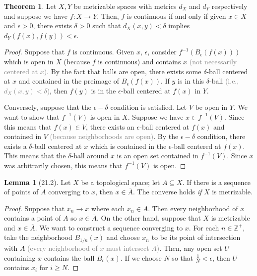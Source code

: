 \documentclass{article}
\newcommand{\nline}{\vspace*{0.5\baselineskip}}
\newcommand{\com}[1]{\textcolor{grey}{#1}}
\theoremstyle{definition}
\newtheorem{theorem}{Theorem}[subsection]
\newtheorem{lemma}{Lemma}[subsection]
\begin{document}
\begin{flushleft}
\begin{theorem}
Let $X, Y$ be metrizable spaces with metrics $d_X$ and $d_Y$ respectively and suppose we have $f : X \to Y$. Then, $f$ is continuous if and only if given $x \in X$ and $\epsilon > 0$, there exists $\delta > 0$ such that $d_X(x,y) < \delta$ implies $d_Y(f(x),f(y)) < \epsilon$.
\end{theorem}

\begin{proof}
Suppose that $f$ is continuous. Given $x$, $\epsilon$, consider $f^{-1}(B_\epsilon(f(x)))$ which is open in $X$ (because $f$ is continuous) and contains $x$ \com{(not necessarily centered at $x$)}. By the fact that balls are open, there exists some $\delta$-ball centered at $x$ and contained in the preimage of $B_\epsilon(f(x))$. If $y$ is in this $\delta$-ball \com{(i.e., $d_X(x,y) < \delta$)}, then $f(y)$ is in the $\epsilon$-ball centered at $f(x)$ in $Y$.

\nline

Conversely, suppose that the $\epsilon-\delta$ condition is satisfied. Let $V$ be open in $Y$. We want to show that $f^{-1}(V)$ is open in $X$. Suppose we have $x \in f^{-1}(V)$. Since this means that $f(x) \in V$, there exists an $\epsilon$-ball centered at $f(x)$ and contained in $V$ \com{(because neighborhoods are open)}. By the $\epsilon-\delta$ condition, there exists a $\delta$-ball centered at $x$ which is contained in the $\epsilon$-ball centered at $f(x)$. This means that the $\delta$-ball around $x$ is an open set contained in $f^{-1}(V)$. Since $x$ was arbitrarily chosen, this means that $f^{-1}(V)$ is open.
\end{proof}

\begin{lemma}[21.2]
Let $X$ be a topological space; let $A \subseteq X$. If there is a sequence of points of $A$ converging to $x$, then $x \in \overline{A}$. The converse holds \textit{if} $X$ is metrizable.
\end{lemma}

\begin{proof}
Suppose that $x_n \to x$ where each $x_n \in A$. Then every neighborhood of $x$ contains a point of $A$ so $x \in \overline{A}$. On the other hand, suppose that $X$ is metrizable and $x \in \overline{A}$. We want to construct a sequence converging to $x$. For each $n \in \mathbb{Z}^+$, take the neighborhood $B_{1/n}(x)$ and choose $x_n$ to be its point of intersection with $A$ \com{(every neighborhood of $x$ must intersect $A$)}. Then, any open set $U$ containing $x$ contains the ball $B_\epsilon(x)$. If we choose $N$ so that $\frac{1}{N} < \epsilon$, then $U$ contains $x_i$ for $i \geq N$.
\end{proof}


\end{flushleft}
\end{document}
